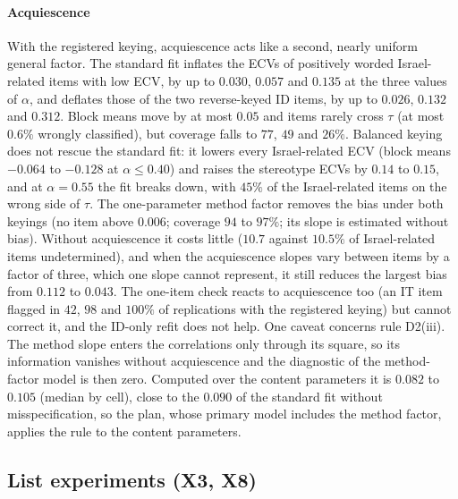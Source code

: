 \paragraph{Acquiescence}
With the registered keying, acquiescence acts like a second, nearly uniform general factor. The standard fit inflates the ECVs of positively worded Israel-related items with low ECV, by up to $0.030$, $0.057$ and $0.135$ at the three values of $\alpha$, and deflates those of the two reverse-keyed ID items, by up to $0.026$, $0.132$ and $0.312$. Block means move by at most $0.05$ and items rarely cross $\tau$ (at most $0.6\%$ wrongly classified), but coverage falls to $77$, $49$ and $26\%$. Balanced keying does not rescue the standard fit: it lowers every Israel-related ECV (block means $-0.064$ to $-0.128$ at $\alpha\le0.40$) and raises the stereotype ECVs by $0.14$ to $0.15$, and at $\alpha=0.55$ the fit breaks down, with $45\%$ of the Israel-related items on the wrong side of $\tau$. The one-parameter method factor removes the bias under both keyings (no item above $0.006$; coverage $94$ to $97\%$; its slope is estimated without bias). Without acquiescence it costs little ($10.7$ against $10.5\%$ of Israel-related items undetermined), and when the acquiescence slopes vary between items by a factor of three, which one slope cannot represent, it still reduces the largest bias from $0.112$ to $0.043$. The one-item check reacts to acquiescence too (an IT item flagged in $42$, $98$ and $100\%$ of replications with the registered keying) but cannot correct it, and the ID-only refit does not help. One caveat concerns rule D2(iii). The method slope enters the correlations only through its square, so its information vanishes without acquiescence and the diagnostic of the method-factor model is then zero. Computed over the content parameters it is $0.082$ to $0.105$ (median by cell), close to the $0.090$ of the standard fit without misspecification, so the plan, whose primary model includes the method factor, applies the rule to the content parameters.

\subsection{List experiments (X3, X8)}\label{sec:sim-list}

